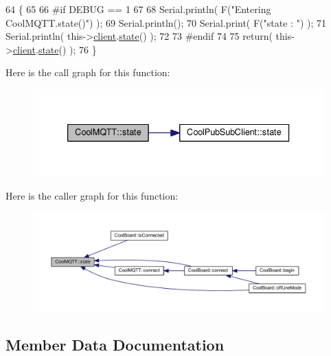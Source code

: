 \begin{DoxyCode}
64 \{
65 
66 \textcolor{preprocessor}{#if DEBUG == 1 }
67 
68     Serial.println( F(\textcolor{stringliteral}{"Entering CoolMQTT.state()"}) );
69     Serial.println();   
70     Serial.print( F(\textcolor{stringliteral}{"state : "}) );
71     Serial.println( this->\hyperlink{class_cool_m_q_t_t_afed1372683c44893b4668d0f1771f514}{client}.\hyperlink{class_cool_pub_sub_client_a3245a5afc6d22e61270dcfe392ccb866}{state}() );
72 
73 \textcolor{preprocessor}{#endif}
74     
75     \textcolor{keywordflow}{return}( this->\hyperlink{class_cool_m_q_t_t_afed1372683c44893b4668d0f1771f514}{client}.\hyperlink{class_cool_pub_sub_client_a3245a5afc6d22e61270dcfe392ccb866}{state}() );
76 \}
\end{DoxyCode}
Here is the call graph for this function\+:\nopagebreak
\begin{figure}[H]
\begin{center}
\leavevmode
\includegraphics[width=333pt]{d0/dd0/class_cool_m_q_t_t_a5d003307eff78efbd585e42b43b72b6d_cgraph}
\end{center}
\end{figure}
Here is the caller graph for this function\+:\nopagebreak
\begin{figure}[H]
\begin{center}
\leavevmode
\includegraphics[width=350pt]{d0/dd0/class_cool_m_q_t_t_a5d003307eff78efbd585e42b43b72b6d_icgraph}
\end{center}
\end{figure}


\subsection{Member Data Documentation}
\mbox{\label{class_cool_m_q_t_t_a7f3cf26b51d6770f216e42c5ef13ca9f}} 
